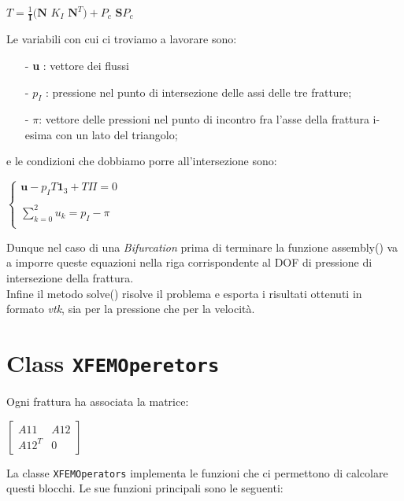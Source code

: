\begin{center}
	$ T = \frac{1}{\textbf{I}}( \textbf{N}$ \textbf{$K_{I}$} $ \textbf{N}^{T} ) + $\textbf{$P_{c}$} $\textbf{S}$\textbf{$P_{c}$}
\end{center}
Le variabili con cui ci troviamo a lavorare sono:
	\begin{enumerate}
	\item[-] \textbf{u} : vettore dei flussi
	\item[-] $p_{I}$ :  pressione nel punto di intersezione delle assi delle tre fratture;
	\item[-] \textbf{$\pi$}: vettore delle pressioni nel punto di incontro fra l'asse della frattura i-esima con un lato del triangolo;
	\end{enumerate} 
e le condizioni che dobbiamo porre all'intersezione sono:
\begin{center}			
	$\left \{
		\begin{array}{l}	
	 		\textbf{u} - p_{I}T\textbf{1}_{3}+T\Pi=0  \\ \\
     	 	\sum_{k=0}^2 u_{k} = p_{I} - \pi  \\
		\end{array}
	\right.$
\end{center}
Dunque nel caso di una \textit{Bifurcation} prima di terminare la funzione assembly() va a imporre queste equazioni nella riga corrispondente al DOF di pressione di intersezione della frattura.\\
Infine il metodo solve() risolve il problema e esporta i risultati ottenuti in formato \emph{vtk}, sia per la pressione che per la velocit\`{a}.\\

\section{Class \texttt{XFEMOperetors}}
Ogni frattura ha associata la matrice:
\begin{center} 
 $ \left[ \begin{matrix}
 	A11 &  A12 \\ 
 	A12^{T} & 0
 \end{matrix}\right] $
\end{center} 

La classe \texttt{XFEMOperators} implementa le funzioni che ci permettono di calcolare questi blocchi.
Le sue funzioni principali sono le seguenti:

